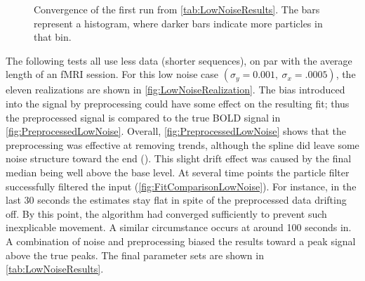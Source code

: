 \begin{figure}
\caption{Convergence of the first run from \autoref{tab:LowNoiseResults}. The bars represent
a histogram, where darker bars indicate more particles in that bin.}
\label{fig:LowNoiseHist}
\end{figure}

The following tests all use less data (shorter sequences), on par with
the average length of an \ac{fMRI} session. For this low noise case
$(\sigma_y = 0.001,\ \sigma_x = .0005)$, the eleven realizations are shown in
\autoref{fig:LowNoiseRealization}.
The bias introduced into the signal by preprocessing
could have some effect on the resulting fit; thus the preprocessed signal is compared
to the true \ac{BOLD} signal in \autoref{fig:PreprocessedLowNoise}.
Overall, \autoref{fig:PreprocessedLowNoise} shows that the preprocessing was
effective at removing trends, although the spline did leave some noise 
structure toward the end (). This slight 
drift effect was caused by the final median being well above the base
level.
At several time points the particle filter successfully filtered the input
(\autoref{fig:FitComparisonLowNoise}).
For instance, in the last 30 seconds
the estimates stay flat in spite of the preprocessed data drifting off. By
this point, the algorithm had converged sufficiently to prevent such inexplicable movement.
A similar circumstance occurs at around 100 seconds in. A combination of
noise and preprocessing biased the results toward a peak signal above the true peaks.
The final parameter sets are shown in
\autoref{tab:LowNoiseResults}.

